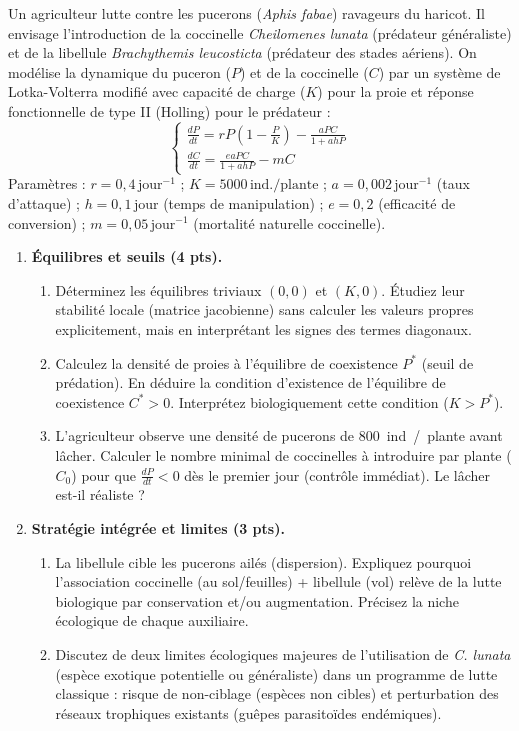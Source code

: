 \documentclass[11pt]{article}
\begin{document}
\begin{exercice}
Un agriculteur lutte contre les pucerons (\textit{Aphis fabae}) ravageurs du haricot. Il envisage l'introduction de la coccinelle \textit{Cheilomenes lunata} (prédateur généraliste) et de la libellule \textit{Brachythemis leucosticta} (prédateur des stades aériens). On modélise la dynamique du puceron ($P$) et de la coccinelle ($C$) par un système de Lotka-Volterra modifié avec capacité de charge ($K$) pour la proie et réponse fonctionnelle de type II (Holling) pour le prédateur :
\[
\begin{cases}
\frac{dP}{dt} = r P \left(1 - \frac{P}{K}\right) - \frac{a P C}{1 + a h P} \\[6pt]
\frac{dC}{dt} = \frac{e a P C}{1 + a h P} - m C
\end{cases}
\]
Paramètres : $r = 0,4\,\text{jour}^{-1}$ ; $K = 5000\,\text{ind./plante}$ ; $a = 0,002\,\text{jour}^{-1}$ (taux d'attaque) ; $h = 0,1\,\text{jour}$ (temps de manipulation) ; $e = 0,2$ (efficacité de conversion) ; $m = 0,05\,\text{jour}^{-1}$ (mortalité naturelle coccinelle).

\begin{enumerate}
\item \textbf{Équilibres et seuils (4 pts).} 
      \begin{enumerate}
      \item Déterminez les équilibres triviaux $(0,0)$ et $(K,0)$. Étudiez leur stabilité locale (matrice jacobienne) sans calculer les valeurs propres explicitement, mais en interprétant les signes des termes diagonaux.
      \item Calculez la densité de proies à l'équilibre de coexistence $P^*$ (seuil de prédation). En déduire la condition d'existence de l'équilibre de coexistence $C^* > 0$. Interprétez biologiquement cette condition ($K > P^*$).
      \item L'agriculteur observe une densité de pucerons de \SI{800}{ind./plante} avant lâcher. Calculer le nombre minimal de coccinelles à introduire par plante ($C_0$) pour que $\frac{dP}{dt} < 0$ dès le premier jour (contrôle immédiat). Le lâcher est-il réaliste ?
      \end{enumerate}
\item \textbf{Stratégie intégrée et limites (3 pts).} 
      \begin{enumerate}
      \item La libellule cible les pucerons ailés (dispersion). Expliquez pourquoi l'association coccinelle (au sol/feuilles) + libellule (vol) relève de la \og{}lutte biologique par conservation\fg{} et/ou \og{}augmentation\fg{}. Précisez la niche écologique de chaque auxiliaire.
      \item Discutez de deux limites écologiques majeures de l'utilisation de \textit{C. lunata} (espèce exotique potentielle ou généraliste) dans un programme de lutte classique : risque de non-ciblage (espèces non cibles) et perturbation des réseaux trophiques existants (guêpes parasitoïdes endémiques).
      \end{enumerate}
\end{enumerate}
\end{exercice}
\end{document}
